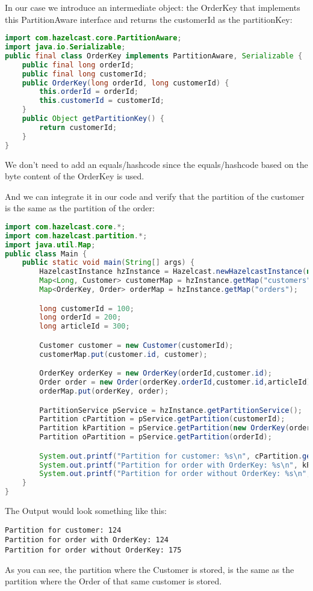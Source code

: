 In our case we introduce an intermediate object: the OrderKey that implements this PartitionAware interface and returns the customerId as the partitionKey:
\begin{lstlisting}[language=java]
import com.hazelcast.core.PartitionAware;
import java.io.Serializable;
public final class OrderKey implements PartitionAware, Serializable {
    public final long orderId;
    public final long customerId;
    public OrderKey(long orderId, long customerId) {
        this.orderId = orderId;
        this.customerId = customerId;
    }
    public Object getPartitionKey() {
        return customerId;
    }
}
\end{lstlisting}
We don't need to add an equals/hashcode since the equals/hashcode based on the byte content of the OrderKey is used.

And we can integrate it in our code and verify that the partition of the customer is the same as the partition of the order:
\begin{lstlisting}[language=java]
import com.hazelcast.core.*;
import com.hazelcast.partition.*;
import java.util.Map;
public class Main {
    public static void main(String[] args) {
        HazelcastInstance hzInstance = Hazelcast.newHazelcastInstance(null);
        Map<Long, Customer> customerMap = hzInstance.getMap("customers");
        Map<OrderKey, Order> orderMap = hzInstance.getMap("orders");

        long customerId = 100;
        long orderId = 200;
        long articleId = 300;

        Customer customer = new Customer(customerId);
        customerMap.put(customer.id, customer);

        OrderKey orderKey = new OrderKey(orderId,customer.id);
        Order order = new Order(orderKey.orderId,customer.id,articleId);
        orderMap.put(orderKey, order);

        PartitionService pService = hzInstance.getPartitionService();
        Partition cPartition = pService.getPartition(customerId);
        Partition kPartition = pService.getPartition(new OrderKey(orderId, customerId));
        Partition oPartition = pService.getPartition(orderId);

        System.out.printf("Partition for customer: %s\n", cPartition.getPartitionId());
        System.out.printf("Partition for order with OrderKey: %s\n", kPartition.getPartitionId());
        System.out.printf("Partition for order without OrderKey: %s\n", oPartition.getPartitionId());
    }
}
\end{lstlisting}
The Output would look something like this:
\begin{lstlisting}
Partition for customer: 124
Partition for order with OrderKey: 124
Partition for order without OrderKey: 175
\end{lstlisting}
As you can see, the partition where the Customer is stored, is the same as the partition where the Order of that same customer is stored. 

